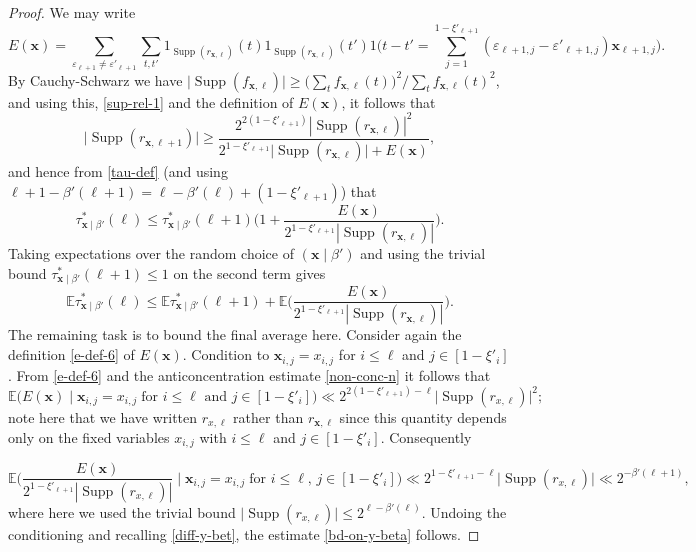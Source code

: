 \documentclass[11pt,reqno]{amsart}
\numberwithin{equation}{section}
\theoremstyle{definition}
\theoremstyle{remark}
\newcommand{\mb}{\mathbb}
\newcommand{\mbf}{\mathbf}
\newcommand{\eps}{\varepsilon}
\newcommand\Supp{\operatorname{Supp}}
\renewcommand{\le}{\leqslant}
\renewcommand{\ge}{\geqslant}
\begin{document}
\begin{proof}
We may write
\begin{equation}\label{e-def-6} E(\mbf{x})= \sum_{\eps_{\ell+1} \ne \eps'_{\ell+1}} \sum_{t,t'} 1_{\Supp(r_{\mbf{x}, \ell})}(t) 1_{\Supp(r_{\mbf{x},\ell})}(t') 1\Big( t - t' = \sum_{j = 1}^{1 - \xi'_{\ell+1}} (\eps_{\ell+1, j} - \eps'_{\ell+1, j}) \mbf{x}_{\ell+1, j}\Big).\end{equation}
By Cauchy-Schwarz we have $\big|\Supp (f_{\mbf{x}, \ell})\big| \ge \big( \sum_t f_{\mbf{x}, \ell}(t) \big)^2/\sum_t f_{\mbf{x}, \ell}(t)^2$, and using this, \cref{sup-rel-1} and the definition of $E(\mbf{x})$, it follows that 
\[ \big|\Supp(r_{\mbf{x}, \ell+1})\big| \ge \frac{2^{2(1 - \xi'_{\ell+1})} |\Supp (r_{\mbf{x}, \ell})|^2}{2^{1 - \xi'_{\ell+1}} \big|\Supp (r_{\mbf{x}, \ell})\big| +  E(\mbf{x})},\] and hence from \cref{tau-def} (and using $\ell+1 - \beta'(\ell+1) = \ell - \beta'(\ell) + (1 - \xi'_{\ell+1})$) that 
\begin{equation*}  \tau^*_{\mbf{x} \mid \beta'}(\ell)  \le \tau^*_{\mbf{x} \mid \beta'}(\ell+1)\Big(1 + \frac{E(\mbf{x})}{2^{1 - \xi'_{\ell+1}} |\Supp(r_{\mbf{x}, \ell})|}\Big). \end{equation*} Taking expectations over the random choice of $(\mbf{x} \mid \beta')$ and using the trivial bound $\tau^*_{\mbf{x} \mid \beta'}(\ell+1) \le 1$ on the second term gives
\begin{equation}\label{diff-y-bet}
\mb{E} \tau^*_{\mbf{x} \mid \beta'}(\ell)  \le \mb{E}\tau^*_{\mbf{x} \mid \beta'}(\ell+1) + \mb{E}\Big( \frac{E(\mbf{x})}{2^{1 - \xi'_{\ell+1}} |\Supp(r_{\mbf{x}, \ell})|}\Big).
\end{equation}
The remaining task is to bound the final average here. Consider again the definition \cref{e-def-6} of $E(\mbf{x})$. Condition to  $\mbf{x}_{i,j} = x_{i,j}$ for $i \le \ell$ and $j \in [1 - \xi'_i]$. From \cref{e-def-6} and the anticoncentration estimate \cref{non-conc-n} it follows that 
\[ \mb{E} \big( E(\mbf{x}) \mid \mbf{x}_{i,j} = x_{i,j} \; \mbox{for $i \le \ell$ and $j \in [1 - \xi'_i]$}\big)  \ll 2^{2(1 - \xi'_{\ell+1}) - \ell} \big| \Supp(r_{x,\ell})\big|^2;\] note here that we have written $r_{x, \ell}$ rather than $r_{\mbf{x}, \ell}$ since this quantity depends only on the fixed variables $x_{i,j}$ with $i \le \ell$ and $j \in [1 - \xi'_i]$. Consequently

 
\[ \mb{E} \bigg( \frac{E(\mbf{x})}{2^{1 - \xi'_{\ell+1}} |\Supp(r_{x,\ell})|}  \mid \mbf{x}_{i,j} = x_{i,j} \; \mbox{for $i \le \ell$, $j \in [1 - \xi'_i]$}\bigg)  \ll 2^{1 - \xi'_{\ell+1} - \ell} \big|\Supp(r_{x,\ell})\big| \ll 2^{-\beta'(\ell+1)}, \] where here we used the trivial bound $\big|\Supp(r_{x,\ell})\big| \le 2^{\ell - \beta'(\ell)}$.
Undoing the conditioning and recalling \cref{diff-y-bet}, the estimate \cref{bd-on-y-beta} follows.

\end{proof}
\end{document}
